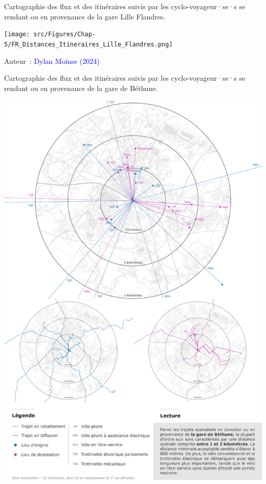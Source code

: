 \begin{refsegment}
    \begin{carte}[h!]\vspace*{4pt}
        \caption{Cartographie des flux et des itinéraires suivis par les cyclo-voyageur·se·s se rendant ou en provenance de la gare Lille Flandres.}
        \label{fig-chap5:itineraires-lille-flandres}
        \centerline{\texttt{[image: src/Figures/Chap-5/FR\_Distances\_Itineraires\_Lille\_Flandres.png]}}
        \vspace{5pt}
        \begin{flushright}\scriptsize{
        Auteur~: \textcolor{blue}{Dylan Moinse (2024)}
        }\end{flushright}
    \end{carte}

    \begin{carte}[h!]\vspace*{4pt}
        \caption{Cartographie des flux et des itinéraires suivis par les cyclo-voyageur·se·s se rendant ou en provenance de la gare de Béthune.}
        \label{fig-chap5:itineraires-bethune}
        \centerline{\includegraphics[width=1\columnwidth]{src/Figures/Chap-5/FR_Distances_Itineraires_Bethune.png}}

\end{carte}
\end{refsegment}
